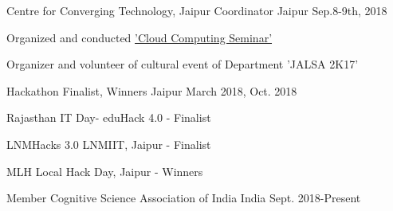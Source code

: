 \vspace{-0.3cm}


\begin{cventries}

  \extraentry
  {Centre for Converging Technology, Jaipur}
  {Coordinator}
  {Jaipur}
  {Sep.8-9th, 2018}
  {
    \begin{cvitems}
    \item Organized and conducted \href{https://drive.google.com/file/d/1PDJYCQRCsk0e_HojYzUzvAWycQPXnXpg/view?usp=sharing}{'Cloud Computing Seminar'}
    \item Organizer and volunteer of cultural event of Department 'JALSA 2K17'
    \end{cvitems}
  }



  \extraentry{}
  {Hackathon Finalist, Winners}
  {Jaipur}
  {March 2018, Oct. 2018}
  {
    \begin{cvitems}
    \item Rajasthan IT Day- eduHack 4.0 - Finalist
    \item LNMHacks 3.0 LNMIIT, Jaipur - Finalist
    \item MLH Local Hack Day, Jaipur - Winners
    \end{cvitems}
  }

  \extraentry
  {Member}
  {Cognitive Science Association of India}
  {India}
  {Sept. 2018-Present}
  {}

  \vspace{-0.3cm}


\end{cventries}

